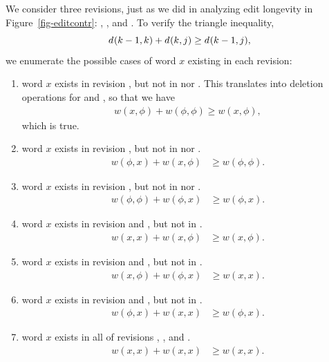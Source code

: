 We consider three revisions, just as we did in analyzing
edit longevity in Figure~\ref{fig-editcontr}: ,
, and .
To verify the triangle inequality,
\begin{equation*}
  d_{}(k-1,k) + d_{}(k,j) \ge d_{}(k-1,j),
\end{equation*}
we enumerate the possible cases of word $x$ existing in each
revision:
\begin{enumerate}
\item word $x$ exists in revision , but not in
   nor .
  This translates into deletion operations for 
  and , so that we have
  \begin{align*}
    w(x, \phi) + w(\phi, \phi) \ge w(x, \phi),
  \end{align*}
  which is true.
\item word $x$ exists in revision , but not in
   nor .
  \begin{align*}
    w(\phi, x) + w(x, \phi) & \ge w(\phi, \phi).
  \end{align*}
\item word $x$ exists in revision , but not in
   nor .
  \begin{align*}
    w(\phi, \phi) + w(\phi, x) & \ge w(\phi, x).
  \end{align*}
\item word $x$ exists in revision  and , but not in
  .
  \begin{align*}
    w(x, x) + w(x, \phi) & \ge w(x, \phi).
  \end{align*}
\item word $x$ exists in revision  and , but not in
  .
  \begin{align*}
    w(x, \phi) + w(\phi, x) & \ge w(x, x).
  \end{align*}
\item word $x$ exists in revision  and , but not in
  .
  \begin{align*}
    w(\phi, x) + w(x, x) & \ge w(\phi, x).
  \end{align*}
\item word $x$ exists in all of revisions , ,
  and .
  \begin{align*}
    w(x, x) + w(x, x) & \ge w(x, x).
  \end{align*}
\end{enumerate}

